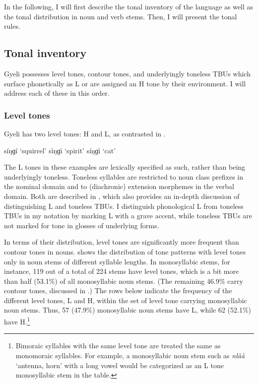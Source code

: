 In the following, I will first describe the tonal inventory of the language as well as the tonal distribution in noun and verb stems. Then, I will present the tonal rules.


\subsection{Tonal inventory}
\label{sec:Tinventory}


Gyeli possesses level tones, contour tones, and underlyingly toneless TBUs which surface phonetically as L or are assigned an H tone by their environment. I will address each of these in this order.

\subsubsection{Level tones}
\label{sec:Level}

Gyeli has two  level tones: H and L, as contrasted in .

\ea \label{singi}
  \ea  síŋɡí `squirrel'
\ex sìŋɡì `spirit'
\ex síŋɡì `cat'
\z
\z

The L tones in these examples are lexically specified as such, rather than being underlyingly toneless. Toneless syllables are restricted to noun class prefixes in the nominal domain and to (diachronic) extension morphemes in the verbal domain. Both are described in , which also provides an in-depth discussion of distinguishing L and toneless TBUs. I distinguish phonological L from toneless TBUs in my notation by marking L with a grave accent, while toneless TBUs are not marked for tone in glosses of underlying forms.  

In terms of their distribution, level tones are significantly more frequent than contour tones in nouns.  shows the distribution of tone patterns with level tones only in noun stems of different syllable lengths. In monosyllabic stems, for instance, 119 out of a total of 224 stems have level tones, which is a bit more than half (53.1\%) of all monosyllabic noun stems. (The remaining 46.9\% carry contour tones, discussed in .) The rows below indicate the frequency of the different level tones, L and H, within the set of level tone carrying monosyllabic noun stems. Thus, 57 (47.9\%) monosyllabic noun stems have L, while 62 (52.1\%) have H.\footnote{Bimoraic syllables with the same level tone are treated the same as monomoraic syllables. For example, a monosyllabic noun stem such as {\itshape nlàà} `antenna, horn' with a long vowel would be categorized as an L tone monosyllabic stem in the table.}

